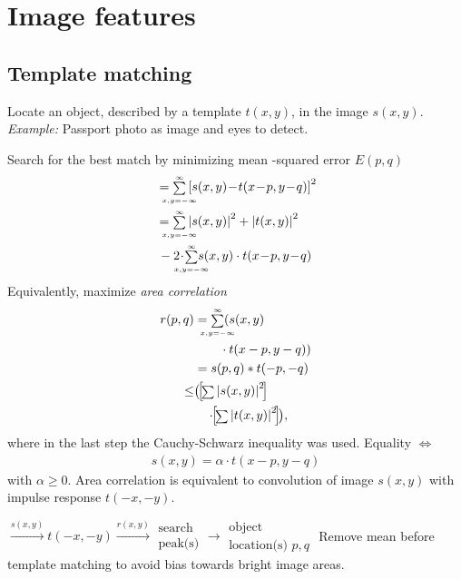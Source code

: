 \chapter{Image features}
\section{Template matching}
\begin{compactdesc}
	\item[\lp{Problem}] Locate an object, described by a template $t(x,y)$, in the image $s(x,y)$. \emph{Example:} Passport photo as image and eyes to detect.
	\item[\lp{Method}] Search for the best match by minimizing mean -squared error $E(p,q)$
		\begin{align*}\scriptscriptstyle
			&={\scriptstyle\sum\limits_{\mathclap{x,y=-\infty}}^{\infty}}\left[ s(x,y)\!-\!t(x\!-\!p,y\!-\!q) \right]^2\\
			&={\scriptstyle\sum\limits_{\mathclap{x,y=-\infty}}^{\infty}}\abs{s(x,y)}^2+\abs{t(x,y)}^2\\
			&\,-2\!\cdot\!{\scriptstyle\sum\limits_{\mathclap{x,y=-\infty}}^{\infty}}s(x,y)\cdot t(x\!-\!p,y\!-\!q)
		\end{align*}
		Equivalently, maximize \emph{area correlation}
		\begin{align*}
			r(p,q)&={\scriptstyle\sum\limits_{\mathclap{x,y=-\infty}}^{\infty}}(s(x,y)\\
			&\quad\hphantom{{\scriptstyle\sum\limits_{\mathclap{x,y=-\infty}}^{\infty}}}\cdot t(x-p,y-q))\\
			&=s(p,q)*t(-p,-q)\\
			\!\!\!\!\leq&\big(\!\!\left[\! {\scriptstyle\sum} \abs{s(x,y)}^2 \!\right]\!\!\\&\quad\cdot\!\!\left[\! {\scriptstyle\sum} \abs{t(x,y)}^2 \!\right]\!\!\big),
		\end{align*}
		where in the last step the Cauchy-Schwarz inequality was used. Equality $\Leftrightarrow$
		\begin{gather*}
			s(x,y)=\alpha\cdot t(x-p,y-q)
		\end{gather*}
		with $\alpha\geq0$.
		Area correlation is equivalent to convolution of image $s(x,y)$ with impulse response $t(-x,-y)$. 
	\item[\lp{Diagram of template matcher}] $\xrightarrow{s(x,y)}t(-x,-y)\xrightarrow{r(x,y)}\displaystyle
		\begin{matrix}
			\text{search}\\
			\text{peak(s)}
		\end{matrix}
		\to
		\begin{matrix}
			\text{object}\\
			\text{location(s) }p,q
		\end{matrix}
		$ Remove mean before template matching to avoid bias towards bright image areas.
\end{compactdesc}

